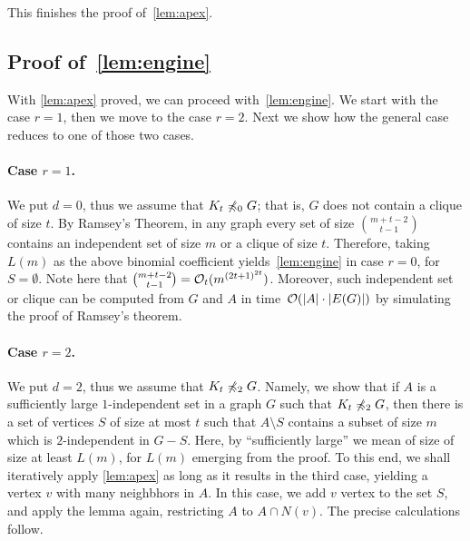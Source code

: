 This finishes the proof of~\cref{lem:apex}.

\subsection{Proof of~\cref{lem:engine}}
\label{sec:engine}

With \cref{lem:apex} proved, we can proceed with~\cref{lem:engine}. 
We start with the case $r=1$, then we move to the case $r=2$. 
Next we show how the general case reduces to one of those two cases.

\paragraph{Case $r=1$.}
We put $d=0$, thus we assume that $K_t\not\preccurlyeq_0 G$; that is, $G$ does not contain a clique of size $t$. By Ramsey's Theorem, in any graph every set of size $\binom{m+t-2}{t-1}$ contains an
independent set of size $m$ or a clique of size $t$. Therefore, 
taking $L(m)$ as the above binomial coefficient yields~\cref{lem:engine} in case $r=0$, for $S=\emptyset$. Note here that $\binom{m+t-2}{t-1}=\mathcal{O}_{t}{(m^{{(2t+1)}^{2t}})}$.
Moreover, such independent set or clique can be computed from $G$ and $A$ in time~$\mathcal{O}(|A|\cdot |E(G)|)$ by simulating the proof of Ramsey's theorem.

\paragraph{Case $r=2$.}
We put $d=2$, thus we assume that $K_t\not\preccurlyeq_2 G$.
Namely, we show that if $A$ is a sufficiently large $1$-independent set in a graph $G$ such that $K_t\not\preccurlyeq_2 G$, 
then there is a set of vertices $S$ of size at most $t$ such that $A\setminus S$ contains a subset of size $m$ which is $2$-independent in $G-S$. 
Here, by ``sufficiently large'' we mean of size of size at least $L(m)$, for $L(m)$ emerging from the proof.
To this end, we shall iteratively apply \cref{lem:apex} as long as  it results in the third case, 
yielding a vertex $v$ with many neighbhors in $A$. In this case, we add $v$ vertex to the set $S$, and apply the lemma again,
restricting $A$ to $A\cap N(v)$. 
The precise calculations follow.

